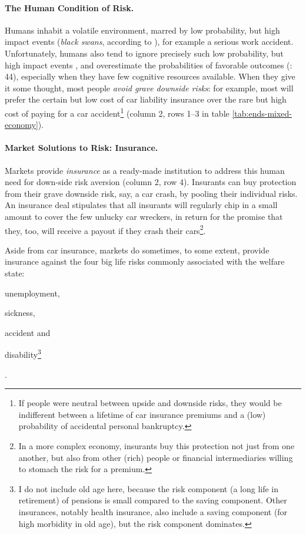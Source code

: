 
\paragraph{The Human Condition of Risk.}  \label{sec:human-condition-of-risk} Humans inhabit a volatile environment, marred by low probability, but high impact events (\emph{black swans}, according to \citealt{Taleb2007}), for example a serious work accident. Unfortunately, humans also tend to ignore precisely such low probability, but high impact events \citep{Taleb2007}, and overestimate the probabilities of favorable outcomes (\citealt{Baron2000}: 44), especially when they have few cognitive resources available.
When they give it some thought, most people \emph{avoid grave downside risks}: for example, most will prefer the certain but low cost of car liability insurance over the rare but high cost of paying for a car accident\footnote{
	If people were neutral between upside and downside risks, they would be indifferent between a lifetime of car insurance premiums and a (low) probability of accidental personal bankruptcy.} %
(column 2, rows 1--3 in table \ref{tab:ends-mixed-economy}).

\paragraph{Market Solutions to Risk: Insurance.}  \label{sec:insurance} Markets provide \emph{insurance} as a ready-made institution to address this human need for down-side risk aversion (column 2, row 4). Insurants can buy protection from their grave downside risk, say, a car crash, by pooling their individual risks. An insurance deal stipulates that all insurants will regularly chip in a small amount to cover the few unlucky car wreckers, in return for the promise that they, too, will receive a payout if they crash their cars\footnote{
	In a more complex economy, insurants buy this protection not just from one another, but also from other (rich) people or financial intermediaries willing to stomach the risk for a premium.}.

Aside from car insurance, markets do sometimes, to some extent, provide insurance against the four big life risks commonly associated with the welfare state: \begin{inparaenum}[1)]
	\item unemployment,
	\item sickness,
	\item accident and
	\item disability\footnote{
	I do not include old age here, because the risk component (a long life in retirement) of pensions is small compared to the saving component. Other insurances, notably health insurance, also include a saving component (for high morbidity in old age), but the risk component dominates.}\end{inparaenum}.

